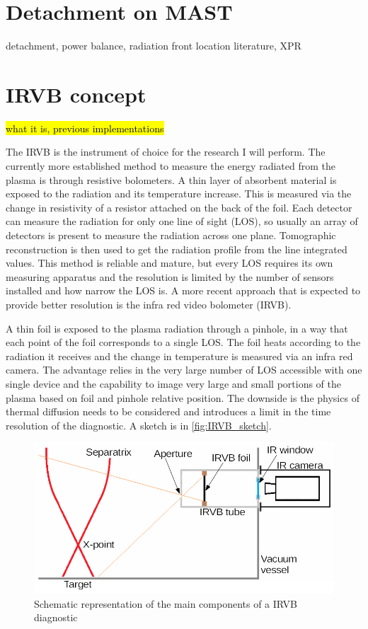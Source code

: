 
\section{Detachment on MAST}
detachment, power balance, radiation front location literature, XPR



\section{IRVB concept}
\hl{what it is, previous implementations}

The IRVB is the instrument of choice for the research I will perform. 
The currently more established method to measure the energy radiated from the plasma is through resistive bolometers. A thin layer of absorbent material is exposed to the radiation and its temperature increase. This is measured via the change in resistivity of a resistor attached on the back of the foil. Each detector can measure the radiation for only one line of sight (LOS), so usually an array of detectors is present to measure the radiation across one plane. Tomographic reconstruction is then used to get the radiation profile from the line integrated values. This method is reliable and mature, but every LOS requires its own measuring apparatus and the resolution is limited by the number of sensors installed and how narrow the LOS is. A more recent approach that is expected to provide better resolution is the infra red video bolometer (IRVB). 

A thin foil is exposed to the plasma radiation through a pinhole, in a way that each point of the foil corresponds to a single LOS. The foil heats according to the radiation it receives and the change in temperature is measured via an infra red camera. The advantage relies in the very large number of LOS accessible with one single device and the capability to image very large and small portions of the plasma based on foil and pinhole relative position. The downside is the physics of thermal diffusion needs to be considered and introduces a limit in the time resolution of the diagnostic. A sketch is in \autoref{fig:IRVB_sketch}.

\begin{figure}
	\centering
	\includegraphics[width=\linewidth]{Chapters/chapter2/figs/IRVB cartoon.png}
	\caption{Schematic representation of the main components of a IRVB diagnostic}
	\label{fig:IRVB_sketch}
\end{figure}


